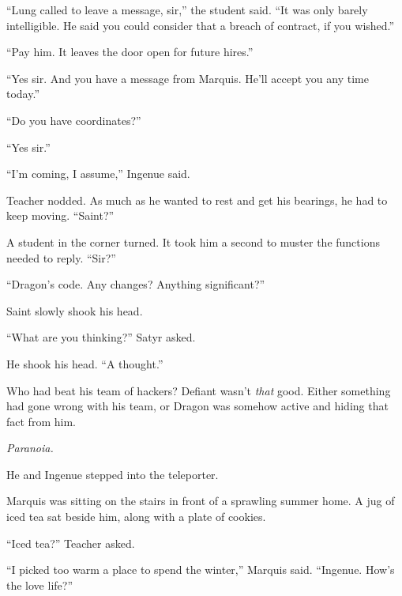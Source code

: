 ``Lung called to leave a message, sir,'' the student said.  ``It was only barely intelligible.  He said you could consider that a breach of contract, if you wished.''



``Pay him.  It leaves the door open for future hires.''



``Yes sir.  And you have a message from Marquis.  He'll accept you any time today.''



``Do you have coordinates?''



``Yes sir.''



``I'm coming, I assume,'' Ingenue said.



Teacher nodded.  As much as he wanted to rest and get his bearings, he had to keep moving.  ``Saint?''



A student in the corner turned.  It took him a second to muster the functions needed to reply.  ``Sir?''



``Dragon's code.  Any changes?  Anything significant?''



Saint slowly shook his head.



``What are you thinking?'' Satyr asked.



He shook his head.  ``A thought.''



Who had beat his team of hackers?  Defiant wasn't \emph{that} good.  Either something had gone wrong with his team, or Dragon was somehow active and hiding that fact from him.



\emph{Paranoia.}



He and Ingenue stepped into the teleporter.



Marquis was sitting on the stairs in front of a sprawling summer home.  A jug of iced tea sat beside him, along with a plate of cookies.



``Iced tea?''  Teacher asked.



``I picked too warm a place to spend the winter,'' Marquis said.  ``Ingenue.  How's the love life?''




